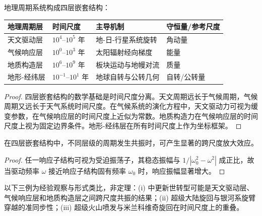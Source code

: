\begin{theorem}[地理周期系统的四层嵌套]\label{thm:geographic_four_layer}
地理周期系统构成四层嵌套结构：
\begin{center}
\begin{tabular}{>{\centering\arraybackslash}p{2.5cm}>{\centering\arraybackslash}p{2.5cm}>{\centering\arraybackslash}p{3cm}>{\centering\arraybackslash}p{2.5cm}}
\toprule
地理周期层 & 时间尺度 & 主导机制 & 守恒量/参考尺度 \\
\midrule
天文驱动层 & $10^4$--$10^5$ 年 & 地-日-行星系统旋转 & 角动量 \\
气候响应层 & $10^0$--$10^3$ 年 & 太阳辐射经向梯度 & 能量 \\
地质构造层 & $10^6$--$10^9$ 年 & 板块运动与地幔对流 & 质量 \\
地形-经纬层 & $10^{-1}$--$10^1$ 年 & 地球自转与公转几何 & 自转/公转量 \\
\bottomrule
\end{tabular}
\end{center}
\end{theorem}

\begin{proof}
四层嵌套结构的数学基础是时间尺度分离。天文周期远长于气候周期，气候周期又远长于天气系统时间尺度。在气候系统的演化方程中，天文驱动力可视为缓变参数，在气候响应层的时间尺度上近似为常数。地质构造力在气候响应层的时间尺度上视为固定边界条件。地形-经纬层在所有时间尺度上作为坐标框架。
\end{proof}

\begin{corollary}[地理系统的跨尺度共振]\label{cor:geographic_cross_scale_resonance}
在四层嵌套结构中，不同层级的周期发生共振时，可产生显著的跨尺度放大效应。
\end{corollary}

\begin{proof}
任一响应子结构可视为受迫振荡子，其稳态振幅与 $1/|\omega_0^2-\omega^2|$ 成正比，故当驱动频率 $\omega$ 接近响应子结构固有频率 $\omega_0$ 时，响应振幅显著增大。
\end{proof}

\begin{remark}[跨尺度共振的经验观察与形式类比]\label{rem:geo_cross_scale_empirical}
以下三例为经验观察与形式类比，非定理：(i) 中更新世转型可能是天文驱动层、气候响应层和地质构造层之间跨尺度共振的结果；(ii) 超级大陆旋回与银河系旋臂穿越的准同步性；(iii) 超级火山喷发与米兰科维奇旋回在时间尺度上的重叠。
\end{remark}

